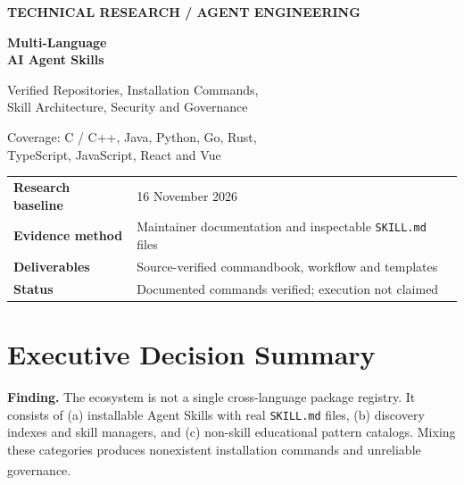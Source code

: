 \documentclass[11pt,letterpaper]{article}
\newcommand{\src}[1]{\textsuperscript{\textcolor{teal}{\cite{#1}}}}
\begin{document}
\begin{titlepage}
\pagecolor{navy}\color{white}
\vspace*{1.05in}
{\small\bfseries\color{white}TECHNICAL RESEARCH \quad / \quad AGENT ENGINEERING}\par
\vspace{0.4in}
{\fontsize{31}{38}\selectfont\bfseries Multi-Language\\[0.1em]AI Agent Skills}\par
\vspace{0.23in}
{\Large\color{white}Verified Repositories, Installation Commands,\\Skill Architecture, Security and Governance}\par
\vspace{0.55in}
\par
\vspace{0.45in}
{\large\color{white}Coverage: C / C++, Java, Python, Go, Rust,\\TypeScript, JavaScript, React and Vue}\par
\vfill
\begin{tabular}{@{}ll@{}}
\textbf{Research baseline} & 16 November 2026\\
\textbf{Evidence method} & Maintainer documentation and inspectable \texttt{SKILL.md} files\\
\textbf{Deliverables} & Source-verified commandbook, workflow and templates\\
\textbf{Status} & Documented commands verified; execution not claimed\\
\end{tabular}
\vspace*{0.65in}
\end{titlepage}
\nopagecolor\color{ink}
\tableofcontents
\newpage

\section{Executive Decision Summary}
\begin{insight}
\textbf{Finding.} The ecosystem is not a single cross-language package registry. It consists of (a) installable Agent Skills with real \texttt{SKILL.md} files, (b) discovery indexes and skill managers, and (c) non-skill educational pattern catalogs. Mixing these categories produces nonexistent installation commands and unreliable governance.\src{spec,vercelcli,patternsrepo,lazyskills}
\end{insight}
\end{document}
